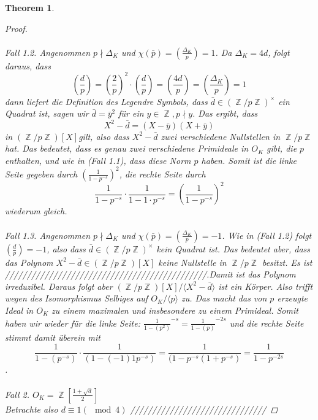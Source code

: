 \documentclass[10pt,a4paper]{article}
\theoremstyle{plain}
\newtheorem{thm}{Theorem}[section]
\theoremstyle{definition}
\theoremstyle{remark}
\DeclareMathOperator{\Z}{\mathbb{Z}}
\begin{document}
\begin{thm}
\begin{proof}
\\
\\
\textit{Fall 1.2.}
Angenommen $p \nmid \Delta_K$ und $\chi(\bar{p})=(\frac{\Delta_K}{p})= 1$. Da $\Delta_K = 4d$, folgt daraus, dass $$(\frac{d}{p})=(\frac{2}{p})^2\cdot (\frac{d}{p})=(\frac{4d}{p})=(\frac{\Delta_K}{p})=1$$ dann liefert die Definition des Legendre Symbols, dass $\bar{d} \in (\Z/p\Z)^\times$ ein Quadrat ist, sagen wir $\bar{d}=\bar{y}^2$ für ein $y \in \Z, p\nmid y$. Das ergibt, dass $$X^2-\bar{d}=(X-\bar{y})(X+\bar{y})$$ in $(\Z/p\Z)[X] $gilt, also dass $X^2-\bar{d}$ zwei verschiedene Nullstellen in $\Z/p\Z$ hat. Das bedeutet, dass es genau zwei verschiedene Primideale in $O_K$ gibt, die $p$ enthalten, und wie in (Fall 1.1), dass diese Norm $p$ haben. Somit ist die linke Seite gegeben durch $(\frac{1}{1-p^{-s}})^2$, die rechte Seite durch $$\frac{1}{1-p^{-s}}\cdot\frac{1}{1-1\cdot p^{-s}}=(\frac{1}{1-p^{-s}})^2$$ wiederum gleich.
\\
\\
\textit{Fall 1.3.}
Angenommen $p \nmid \Delta_K$ und $\chi(\bar{p})=(\frac{\Delta_K}{p})= -1$. Wie in (Fall 1.2) folgt $(\frac{d}{p})=-1$, also dass $\bar{d} \in (\Z/p\Z)^\times$ kein Quadrat ist. Das bedeutet aber, dass das Polynom $X^2-\bar{d} \in (\Z/p\Z)[X] $ keine Nullstelle in $\Z/p\Z$ besitzt. Es ist //////////////////////////////////////////////.Damit ist das Polynom irreduzibel. Daraus folgt aber $(\Z/p\Z)[X]/\langle X^{2}-\bar{d}\rangle$ ist ein Körper. Also trifft wegen des Isomorphismus Selbiges auf $O_K/\langle p\rangle$ zu. Das macht das von $p$ erzeugte Ideal in $O_K$ zu einem maximalen und insbesondere zu einem Primideal. Somit haben wir wieder für die linke Seite: $\frac{1}{1-(p^{2})}^{-s}=\frac{1}{1-(p)}^{-2s}$ und die rechte Seite stimmt damit überein mit $$\frac{1}{1-(p^{-s})}\cdot\frac{1}{(1-(-1)1p^{-s})}=\frac{1}{(1-p^{-s}(1+p^{-s})}=\frac{1}{1-p^{-2s}}$$.
\\
\\
\textit{Fall 2.}
$O_K= \Z[\frac{1+\sqrt{d}}{2}]$ \\
Betrachte also $d\equiv 1 (\mod 4)$
///////////////////////////////

\end{proof}
\end{thm}
\end{document}
